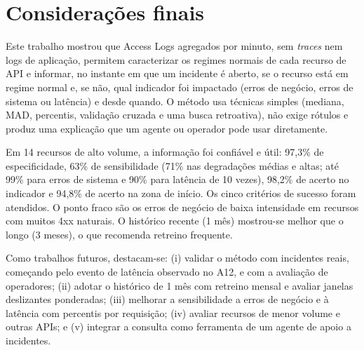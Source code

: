 \documentclass[sigconf,nonacm]{acmart}
\begin{document}
\section{Considerações finais}\label{sec:conclusao}

Este trabalho mostrou que Access Logs agregados por minuto, sem \emph{traces} nem logs de aplicação, permitem caracterizar os regimes normais de cada recurso de API e informar, no instante em que um incidente é aberto, se o recurso está em regime normal e, se não, qual indicador foi impactado (erros de negócio, erros de sistema ou latência) e desde quando. O método usa técnicas simples (mediana, MAD, percentis, validação cruzada e uma busca retroativa), não exige rótulos e produz uma explicação que um agente ou operador pode usar diretamente.

Em 14 recursos de alto volume, a informação foi confiável e útil: 97,3\% de especificidade, 63\% de sensibilidade (71\% nas degradações médias e altas; até 99\% para erros de sistema e 90\% para latência de 10 vezes), 98,2\% de acerto no indicador e 94,8\% de acerto na zona de início. Os cinco critérios de sucesso foram atendidos. O ponto fraco são os erros de negócio de baixa intensidade em recursos com muitos 4xx naturais. O histórico recente (1 mês) mostrou-se melhor que o longo (3 meses), o que recomenda retreino frequente.

Como trabalhos futuros, destacam-se: (i) validar o método com incidentes reais, começando pelo evento de latência observado no A12, e com a avaliação de operadores; (ii) adotar o histórico de 1 mês com retreino mensal e avaliar janelas deslizantes ponderadas; (iii) melhorar a sensibilidade a erros de negócio e à latência com percentis por requisição; (iv) avaliar recursos de menor volume e outras APIs; e (v) integrar a consulta como ferramenta de um agente de apoio a incidentes.



\end{document}
